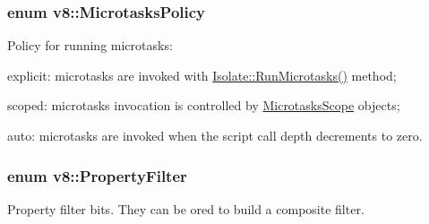\subsubsection[{\texorpdfstring{Microtasks\+Policy}{MicrotasksPolicy}}]{\setlength{\rightskip}{0pt plus 5cm}enum {\bf v8\+::\+Microtasks\+Policy}\hspace{0.3cm}{\ttfamily [strong]}}\hypertarget{namespacev8_a2f183b102b3d1b7a30a805e8c53c04da}{}\label{namespacev8_a2f183b102b3d1b7a30a805e8c53c04da}
Policy for running microtasks\+:
\begin{DoxyItemize}
\item explicit\+: microtasks are invoked with \hyperlink{classv8_1_1_isolate_ac3cbe2a1632eb863912640dcfc98b6c8}{Isolate\+::\+Run\+Microtasks()} method;
\item scoped\+: microtasks invocation is controlled by \hyperlink{classv8_1_1_microtasks_scope}{Microtasks\+Scope} objects;
\item auto\+: microtasks are invoked when the script call depth decrements to zero. 
\end{DoxyItemize}
\subsubsection[{\texorpdfstring{Property\+Filter}{PropertyFilter}}]{\setlength{\rightskip}{0pt plus 5cm}enum {\bf v8\+::\+Property\+Filter}}\hypertarget{namespacev8_afbf02b6b1152a3e25d7bde90798209ac}{}\label{namespacev8_afbf02b6b1152a3e25d7bde90798209ac}
Property filter bits. They can be or\textquotesingle{}ed to build a composite filter. 